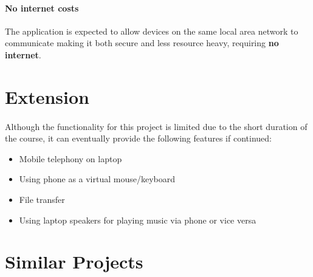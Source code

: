 \documentclass[12pt, letterpaper, titlepage]{article}
\begin{document}
    \paragraph{No internet costs}
    The application is expected to allow devices on the same local area network
    to communicate making it both secure and less resource heavy, requiring
    \textbf{no internet}.


\section{Extension}

    \paragraph{}
    Although the functionality for this project is limited due to the short
    duration of the course, it can eventually provide the following features if
    continued:
    \begin{itemize}
        \item{Mobile telephony on laptop}
        \item{Using phone as a virtual mouse/keyboard}
        \item{File transfer}
        \item{Using laptop speakers for playing music via phone or vice versa}
    \end{itemize}


\newpage
\section{Similar Projects}
\end{document}
